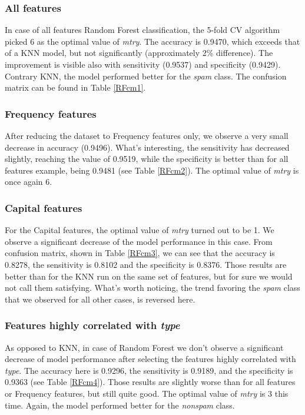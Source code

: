 \documentclass{article}\usepackage[]{graphicx}\usepackage[]{xcolor}
\begin{document}
\subsubsection*{All features}

In case of all features Random Forest classification, the 5-fold CV algorithm picked 
6 as the optimal value of \textit{mtry}. The accuracy is 0.9470, which exceeds that 
of a KNN model, but not significantly (approximately 2\% difference).
The improvement is visible also with sensitivity (0.9537) and specificity (0.9429).
Contrary KNN, the model performed better for the \textit{spam} class.
The confusion matrix can be found in Table \ref{RFcm1}.

\subsubsection*{Frequency features}

After reducing the dataset to Frequency features only, we observe a very small decrease
in accuracy (0.9496). What's interesting, the sensitivity has decreased slightly,
reaching the value of 0.9519, while the specificity is better than for all features example,
being 0.9481 (see Table \ref{RFcm2}). The optimal value of \textit{mtry} is once again 6.

\subsubsection*{Capital features}

For the Capital features, the optimal value of \textit{mtry} turned out to be 1.
We observe a significant decrease of the model performance in this case. 
From confusion matrix, shown in Table \ref{RFcm3}, we can see that the accuracy
is 0.8278, the sensitivity is 0.8102 and the specificity is 0.8376. Those results 
are better than for the KNN run on the same set of features, but for sure we would 
not call them satisfying. What's worth noticing, the trend favoring the \textit{spam}
class that we observed for all other cases, is reversed here.

\subsubsection*{Features highly correlated with \textit{type}}

As opposed to KNN, in case of Random Forest we don't observe a significant decrease
of model performance after selecting the features highly correlated with \textit{type}.
The accuracy here is 0.9296, the sensitivity is 0.9189, and the specificity is 0.9363 (see Table \ref{RFcm4}).
Those results are slightly worse than for all features or Frequency features, but
still quite good. The optimal value of \textit{mtry} is 3 this time.
Again, the model performed better for the \textit{nonspam} class.
\end{document}
